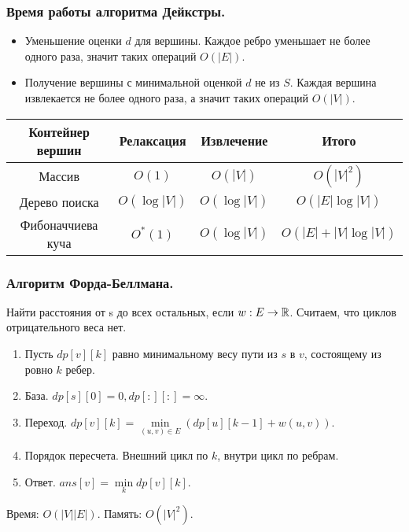 \documentclass[a4paper,14pt]{article}
\begin{document}
    \subsubsection*{Время работы алгоритма Дейкстры.}
    \begin{itemize}
        \item Уменьшение оценки $d$ для вершины. Каждое ребро уменьшает
        не более одного раза, значит таких операций $O(|E|)$.
        \item Получение вершины с минимальной оценкой $d$ не из $S$.
        Каждая вершина извлекается не более одного раза, а значит
        таких операций $O(|V|)$.
    \end{itemize}
    \begin{table}[h!]
        \centering
        \begin{tabular}{|c|c|c|c|}
        \hline
        \textbf{Контейнер вершин} & \textbf{Релаксация} & \textbf{Извлечение} & \textbf{Итого} \\
        \hline
        Массив & $O(1)$ & $O(|V|)$ & $O(|V|^2)$ \\
        \hline
        Дерево поиска & $O(\log |V|)$ & $O(\log |V|)$ & $O(|E| \log |V|)$ \\
        \hline
        Фибоначчиева куча & $O^*(1)$ & $O(\log |V|)$ & $O(|E| + |V| \log |V|)$ \\
        \hline
        \end{tabular}
    \end{table}        

    \subsubsection*{Алгоритм Форда-Беллмана.}
    \label{subsubsec:ford_bellman}
    \begin{problem}
        Найти расстояния от s до всех остальных, если $w: E\rightarrow \mathbb{R}$. Считаем, что циклов отрицательного веса нет.
    \end{problem}
    \begin{enumerate}
        \item Пусть $dp[v][k]$ равно минимальному весу пути из $s$ в $v$,
        состоящему из ровно $k$ ребер.
        \item База. $dp[s][0] = 0, dp[:][:] = \infty$.
        \item Переход. $dp[v][k] = \min\limits_{(u,v)\in E}(dp[u][k-1]+w(u,v))$.
        \item Порядок пересчета. Внешний цикл по $k$, внутри цикл по
        ребрам.
        \item Ответ. $ans[v] = \min\limits_k dp[v][k]$.
    \end{enumerate}
    Время: $O(|V||E|)$. Память: $O(|V|^2)$.
\end{document}
